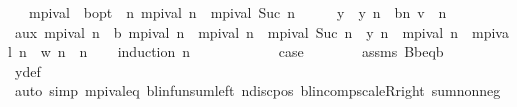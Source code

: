 \begin{isabellebody}
\ \ \ {\isachardoublequoteopen}mpi{\isacharunderscore}{\kern0pt}val\ {\isasymlonglonglongrightarrow}\ {\isasymnu}\isactrlsub b{\isacharunderscore}{\kern0pt}opt{\isachardoublequoteclose}\ \ {\isachardoublequoteopen}{\isasymAnd}n{\isachardot}{\kern0pt}\ mpi{\isacharunderscore}{\kern0pt}val\ n\ {\isasymle}\ mpi{\isacharunderscore}{\kern0pt}val\ {\isacharparenleft}{\kern0pt}Suc\ n{\isacharparenright}{\kern0pt}{\isachardoublequoteclose}\isanewline
%
\isadelimproof
%
\endisadelimproof
%
\isatagproof
{}\isamarkupfalse%
\ {\isacharminus}{\kern0pt}\isanewline
\ \ \isamarkupfalse%
\ y\ \ {\isachardoublequoteopen}y\ n\ {\isacharequal}{\kern0pt}\ {\isacharparenleft}{\kern0pt}{\isasymL}\isactrlsub b{\isacharcircum}{\kern0pt}{\isacharcircum}{\kern0pt}n{\isacharparenright}{\kern0pt}\ v{}{\isachardoublequoteclose}\ \ n\isanewline
\ \ \isamarkupfalse%
\ aux{\isacharcolon}{\kern0pt}\ {\isachardoublequoteopen}mpi{\isacharunderscore}{\kern0pt}val\ n\ {\isasymle}\ {\isasymL}\isactrlsub b\ {\isacharparenleft}{\kern0pt}mpi{\isacharunderscore}{\kern0pt}val\ n{\isacharparenright}{\kern0pt}\ {\isasymand}\ mpi{\isacharunderscore}{\kern0pt}val\ n\ {\isasymle}\ mpi{\isacharunderscore}{\kern0pt}val\ {\isacharparenleft}{\kern0pt}Suc\ n{\isacharparenright}{\kern0pt}\ {\isasymand}\ y\ n\ {\isasymle}\ mpi{\isacharunderscore}{\kern0pt}val\ n\ {\isasymand}\ mpi{\isacharunderscore}{\kern0pt}val\ n\ {\isasymle}\ w\ n{\isachardoublequoteclose}\ \ n\isanewline
\ \ \isamarkupfalse%
\ {\isacharparenleft}{\kern0pt}induction\ n{\isacharparenright}{\kern0pt}\isanewline
\ \ \ \ \isamarkupfalse%
\ {}\isanewline
\ \ \ \ \isamarkupfalse%
\ {\isacharquery}{\kern0pt}case\isanewline
\ \ \ \ \ \ \isamarkupfalse%
\ assms\ B\isactrlsub b{\isacharunderscore}{\kern0pt}eq{\isacharunderscore}{\kern0pt}{\isasymL}\isactrlsub b\isanewline
\ \ \ \ \ \ \isamarkupfalse%
\ y{\isacharunderscore}{\kern0pt}def\isanewline
\ \ \ \ \ \ \isamarkupfalse%
\ {\isacharparenleft}{\kern0pt}auto\ simp{\isacharcolon}{\kern0pt}\ mpi{\isacharunderscore}{\kern0pt}val{\isacharunderscore}{\kern0pt}eq\ blinfun{\isachardot}{\kern0pt}sum{\isacharunderscore}{\kern0pt}left\ {\isasymP}n{\isacharunderscore}{\kern0pt}disc{\isacharunderscore}{\kern0pt}pos\ blincomp{\isacharunderscore}{\kern0pt}scaleR{\isacharunderscore}{\kern0pt}right\ sum{\isacharunderscore}{\kern0pt}nonneg{\isacharparenright}{\kern0pt}\isanewline

\end{isabellebody}
